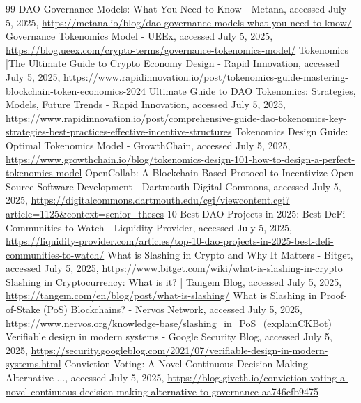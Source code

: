 \documentclass{article}
\begin{document}
\begin{thebibliography}{99}
DAO Governance Models: What You Need to Know - Metana, accessed July 5, 2025, \url{https://metana.io/blog/dao-governance-models-what-you-need-to-know/}
Governance Tokenomics Model - UEEx, accessed July 5, 2025, \url{https://blog.ueex.com/crypto-terms/governance-tokenomics-model/}
Tokenomics |The Ultimate Guide to Crypto Economy Design - Rapid Innovation, accessed July 5, 2025, \url{https://www.rapidinnovation.io/post/tokenomics-guide-mastering-blockchain-token-economics-2024}
Ultimate Guide to DAO Tokenomics: Strategies, Models, Future Trends - Rapid Innovation, accessed July 5, 2025, \url{https://www.rapidinnovation.io/post/comprehensive-guide-dao-tokenomics-key-strategies-best-practices-effective-incentive-structures}
Tokenomics Design Guide: Optimal Tokenomics Model - GrowthChain, accessed July 5, 2025, \url{https://www.growthchain.io/blog/tokenomics-design-101-how-to-design-a-perfect-tokenomics-model}
OpenCollab: A Blockchain Based Protocol to Incentivize Open Source Software Development - Dartmouth Digital Commons, accessed July 5, 2025, \url{https://digitalcommons.dartmouth.edu/cgi/viewcontent.cgi?article=1125&context=senior\_theses}
10 Best DAO Projects in 2025: Best DeFi Communities to Watch - Liquidity Provider, accessed July 5, 2025, \url{https://liquidity-provider.com/articles/top-10-dao-projects-in-2025-best-defi-communities-to-watch/}
What is Slashing in Crypto and Why It Matters - Bitget, accessed July 5, 2025, \url{https://www.bitget.com/wiki/what-is-slashing-in-crypto}
Slashing in Cryptocurrency: What is it? | Tangem Blog, accessed July 5, 2025, \url{https://tangem.com/en/blog/post/what-is-slashing/}
What is Slashing in Proof-of-Stake (PoS) Blockchains? - Nervos Network, accessed July 5, 2025, \url{https://www.nervos.org/knowledge-base/slashing\_in\_PoS\_(explainCKBot)}
Verifiable design in modern systems - Google Security Blog, accessed July 5, 2025, \url{https://security.googleblog.com/2021/07/verifiable-design-in-modern-systems.html}
Conviction Voting: A Novel Continuous Decision Making Alternative ..., accessed July 5, 2025, \url{https://blog.giveth.io/conviction-voting-a-novel-continuous-decision-making-alternative-to-governance-aa746cfb9475}
\fussy
\end{thebibliography}
\end{document}
